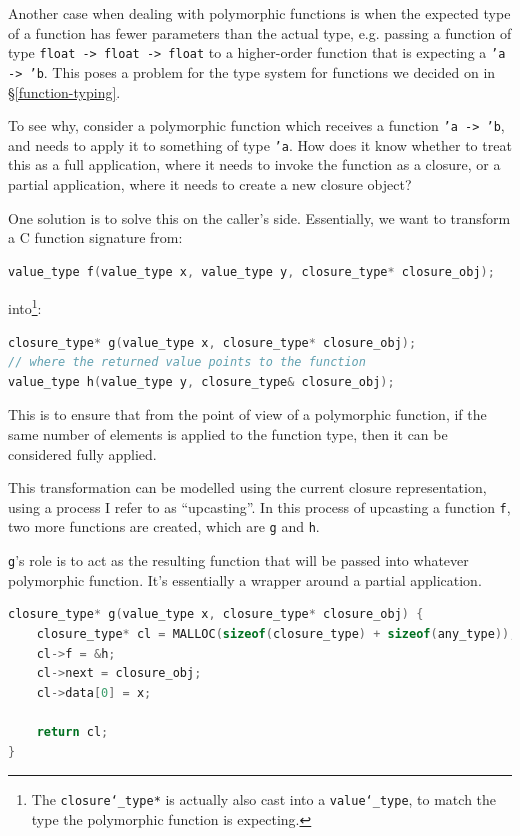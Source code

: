 Another case when dealing with polymorphic functions is when the expected type
of a function has fewer parameters than the actual type, e.g.  passing a
function of type \texttt{float -> float -> float} to a higher-order function
that is expecting a \texttt{'a -> 'b}. This poses a problem for the type system
for functions we decided on in \S\ref{function-typing}.

To see why, consider a polymorphic function which receives a function 
\texttt{'a -> 'b}, and needs to apply it to something of type \texttt{'a}. How 
does it know whether to treat this as a full application, where it needs to 
invoke the function as a closure, or a partial application, where it needs to 
create a new closure object?

One solution is to solve this on the caller's side. Essentially, we want to
transform a C function signature from:

\begin{lstlisting}[language=C]
value_type f(value_type x, value_type y, closure_type* closure_obj);
\end{lstlisting}

into\footnote{The \texttt{closure\char`_type*} is actually also cast into a 
\texttt{value\char`_type}, to match the type the polymorphic function is 
expecting.}:

\begin{lstlisting}[language=C]
closure_type* g(value_type x, closure_type* closure_obj);
// where the returned value points to the function
value_type h(value_type y, closure_type& closure_obj);
\end{lstlisting}

This is to ensure that from the point of view of a polymorphic function, if the 
same number of elements is applied to the function type, then it can be 
considered fully applied.

This transformation can be modelled using the current closure representation,
using a process I refer to as ``upcasting''. In this process of upcasting a
function \texttt{f}, two more functions are created, which are \texttt{g} and
\texttt{h}.

\texttt{g}'s role is to act as the resulting function that will be passed into
whatever polymorphic function. It's essentially a wrapper around a partial
application.

\begin{lstlisting}[language=C]
closure_type* g(value_type x, closure_type* closure_obj) {
    closure_type* cl = MALLOC(sizeof(closure_type) + sizeof(any_type));
    cl->f = &h;
    cl->next = closure_obj;
    cl->data[0] = x;
    
    return cl;
}
\end{lstlisting}


